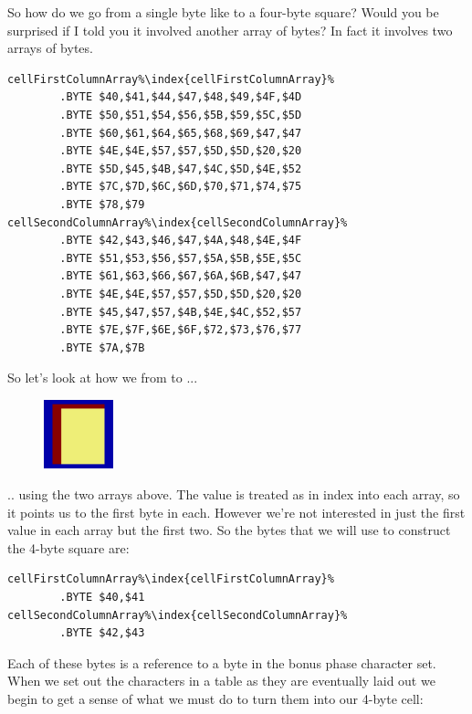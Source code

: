 So how do we go from a single byte like  to a four-byte square? Would you be surprised
if I told you it involved another array of bytes? In fact it involves two arrays of bytes.

\begin{lstlisting}[escapechar=\%]
cellFirstColumnArray%\index{cellFirstColumnArray}%
        .BYTE $40,$41,$44,$47,$48,$49,$4F,$4D
        .BYTE $50,$51,$54,$56,$5B,$59,$5C,$5D
        .BYTE $60,$61,$64,$65,$68,$69,$47,$47
        .BYTE $4E,$4E,$57,$57,$5D,$5D,$20,$20
        .BYTE $5D,$45,$4B,$47,$4C,$5D,$4E,$52
        .BYTE $7C,$7D,$6C,$6D,$70,$71,$74,$75
        .BYTE $78,$79
cellSecondColumnArray%\index{cellSecondColumnArray}%   
        .BYTE $42,$43,$46,$47,$4A,$48,$4E,$4F
        .BYTE $51,$53,$56,$57,$5A,$5B,$5E,$5C
        .BYTE $61,$63,$66,$67,$6A,$6B,$47,$47
        .BYTE $4E,$4E,$57,$57,$5D,$5D,$20,$20
        .BYTE $45,$47,$57,$4B,$4E,$4C,$52,$57
        .BYTE $7E,$7F,$6E,$6F,$72,$73,$76,$77
        .BYTE $7A,$7B
\end{lstlisting}


So let's look at how we from  to ...

\begin{figure}[H]
  {
    \begin{adjustbox}{width=2cm,center}
        \includegraphics[width=2cm]{src/bonusphase/row21_cell0.png}%
    \end{adjustbox}
  }
\end{figure}

.. using the two arrays above. The value  is treated as in index into each array, so it
points us to the first byte in each. However we're not interested in just the first value in each array
but the first two. So the bytes that we will use to construct the 4-byte square are:


\begin{lstlisting}[escapechar=\%]
cellFirstColumnArray%\index{cellFirstColumnArray}%
        .BYTE $40,$41
cellSecondColumnArray%\index{cellSecondColumnArray}%   
        .BYTE $42,$43
\end{lstlisting}

Each of these bytes is a reference to a byte in the bonus phase character set. When we set out the
characters in a table as they are eventually laid out we begin to get a sense of what we must do
to turn them into our 4-byte cell:

